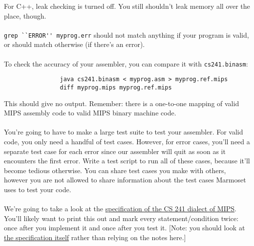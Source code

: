 \documentclass[]{article}
\theoremstyle{definition}
\begin{document}
			For C++, leak checking is turned off. You still shouldn't leak memory all over the place, though.
			\\ \\
			\verb+grep ``ERROR'' myprog.err+ should not match anything if your program is valid, or should match otherwise (if there's an error).
			\\ \\
			To check the accuracy of your assembler, you can compare it with \verb+cs241.binasm+:
			\begin{verbatim}
				java cs241.binasm < myprog.asm > myprog.ref.mips
				diff myprog.mips myprog.ref.mips
			\end{verbatim}
			This should give no output. Remember: there is a one-to-one mapping of valid MIPS assembly code to valid MIPS binary machine code.
			\\ \\
			You're going to have to make a large test suite to test your assembler. For valid code, you only need a handful of test cases. However, for error cases, you'll need a separate test case for each error since our assembler will quit as soon as it encounters the first error. Write a test script to run all of these cases, because it'll become tedious otherwise. You can share test cases you make with others, however you are not allowed to share information about the test cases Marmoset uses to test your code.
			\\ \\
			We're going to take a look at the \href{https://www.student.cs.uwaterloo.ca/~cs241/mips/mipsasm.html}{specification of the CS 241 dialect of MIPS}. You'll likely want to print this out and mark every statement/condition twice: once after you implement it and once after you test it. [Note: you should look at \href{https://www.student.cs.uwaterloo.ca/~cs241/mips/mipsasm.html}{the specification itself} rather than relying on the notes here.]
			
\end{document}

